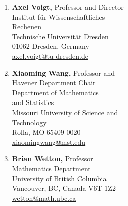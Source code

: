 \documentclass[11pt]{letter}
\begin{document}
\begin{multicols}{2}
\begin{enumerate}
 	\item
\textbf{Axel Voigt,} Professor and Director
	\\
Institut f\"{u}r Wissenschaftliches 
	\\
\hspace*{0.25in} Rechenen
	\\
Technische Universit\"{a}t Dresden
	\\
01062 Dresden, Germany
	\\
\url{axel.voigt@tu-dresden.de}
	
	\item
\textbf{Xiaoming Wang,} Professor and  
	\\
\hspace*{0.25in} Havener Department Chair
	\\
Department of Mathematics 
	\\
\hspace*{0.25in}and Statistics
	\\
Missouri University of Science and
	\\
\hspace*{0.25in} Technology
	\\
Rolla, MO 65409-0020
	\\
\url{xiaomingwang@mst.edu}
	\item
\textbf{Brian Wetton,} Professor
	\\
Mathematics Department
	\\
University of British Columbia 
	\\
Vancouver, BC, Canada V6T 1Z2
	\\
\url{wetton@math.ubc.ca}

	\end{enumerate}
	
	\end{multicols}
	
    
\end{document}
